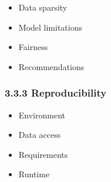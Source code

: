 \documentclass[
]{article}
\providecommand{\tightlist}{%
  \setlength{\itemsep}{0pt}\setlength{\parskip}{0pt}}
\begin{document}
\begin{itemize}
\tightlist
\item
  Data sparsity\\
\item
  Model limitations\\
\item
  Fairness\\
\item
  Recommendations \newpage
\end{itemize}

\subsubsection{3.3.3 Reproducibility}\label{reproducibility}

\begin{itemize}
\tightlist
\item
  Environment\\
\item
  Data access\\
\item
  Requirements\\
\item
  Runtime \newpage
\end{itemize}
\end{document}
